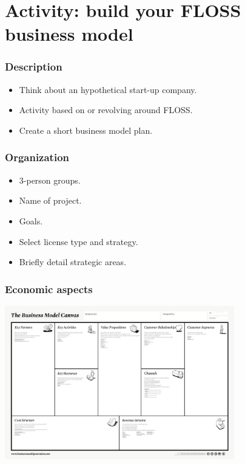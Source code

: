 
\section{Activity: build your FLOSS business model}

\begin{frame}
\frametitle{Description}
\begin{itemize}
  \item Think about an hypothetical start-up company.
  \item Activity based on or revolving around FLOSS.
  \item Create a short business model plan.
\end{itemize}
\end{frame}

\begin{frame}
\frametitle{Organization}

\begin{itemize}
 \item 3-person groups.
 \item Name of project.
 \item Goals.
 \item Select license type and strategy.
 \item Briefly detail strategic areas.
\end{itemize}

\end{frame}

\begin{frame}
\frametitle{Economic aspects}

\includegraphics[width=10cm]{figs/business-model-canvas.jpg}

\end{frame}

